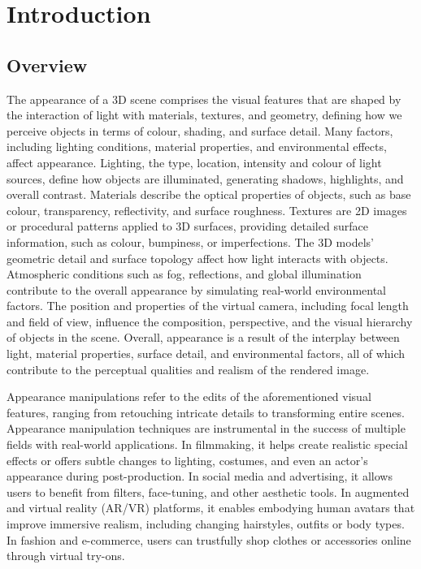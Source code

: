 \chapter{Introduction}






\section{Overview} 

The appearance of a 3D scene comprises the visual features that are shaped by the interaction of light with materials, textures, and geometry, defining how we perceive objects in terms of colour, shading, and surface detail. Many factors, including lighting conditions, material properties, and environmental effects, affect appearance. Lighting, the type, location, intensity and colour of light sources, define how objects are illuminated, generating shadows, highlights, and overall contrast. Materials describe the optical properties of objects, such as base colour, transparency, reflectivity, and surface roughness. Textures are 2D images or procedural patterns applied to 3D surfaces, providing detailed surface information, such as colour, bumpiness, or imperfections. The 3D models' geometric detail and surface topology affect how light interacts with objects. Atmospheric conditions such as fog, reflections, and global illumination contribute to the overall appearance by simulating real-world environmental factors. The position and properties of the virtual camera, including focal length and field of view, influence the composition, perspective, and the visual hierarchy of objects in the scene. Overall, appearance is a result of the interplay between light, material properties, surface detail, and environmental factors, all of which contribute to the perceptual qualities and realism of the rendered image.

Appearance manipulations refer to the edits of the aforementioned visual features, ranging from retouching intricate details to transforming entire scenes. Appearance manipulation techniques are instrumental in the success of multiple fields with real-world applications. In filmmaking, it helps create realistic special effects or offers subtle changes to lighting, costumes, and even an actor’s appearance during post-production. In social media and advertising, it allows users to benefit from filters, face-tuning, and other aesthetic tools. In augmented and virtual reality (AR/VR) platforms, it enables embodying human avatars that improve immersive realism, including changing hairstyles, outfits or body types. In fashion and e-commerce, users can trustfully shop clothes or accessories online through virtual try-ons. 

